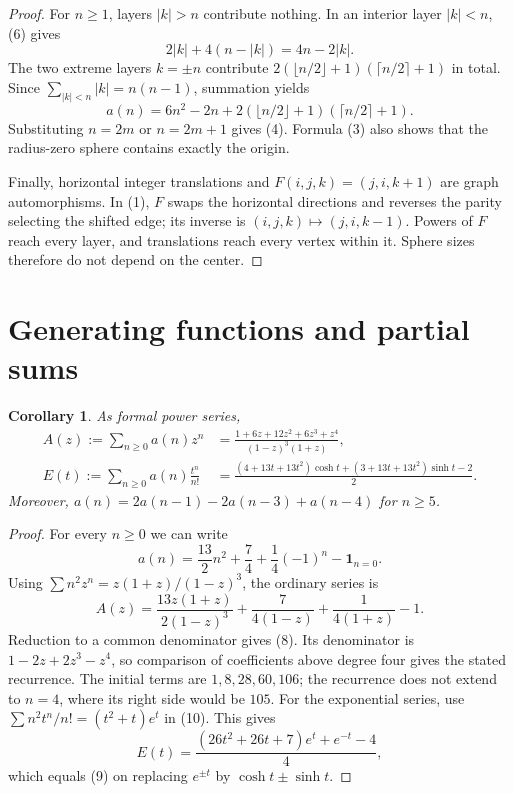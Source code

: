 \documentclass[10pt]{article}
\newtheorem{corollary}[theorem]{Corollary}
\begin{document}
\begin{proof}
For $n\geq1$, layers $|k|>n$ contribute nothing. In an interior
layer $|k|<n$, (6) gives
\[
 2|k|+4(n-|k|)=4n-2|k|.
\]
The two extreme layers $k=\pm n$ contribute
$2(\lfloor n/2\rfloor+1)(\lceil n/2\rceil+1)$ in total.
Since $\sum_{|k|<n}|k|=n(n-1)$, summation yields
\[
 a(n)=6n^2-2n+
       2(\lfloor n/2\rfloor+1)(\lceil n/2\rceil+1).             \tag{7}
\]
Substituting $n=2m$ or $n=2m+1$ gives (4). Formula (3) also shows
that the radius-zero sphere contains exactly the origin.

Finally, horizontal integer translations and
$F(i,j,k)=(j,i,k+1)$ are graph automorphisms. In (1), $F$ swaps
the horizontal directions and reverses the parity selecting the shifted
edge; its inverse is $(i,j,k)\mapsto(j,i,k-1)$.
Powers of $F$ reach every layer, and translations reach every vertex
within it. Sphere sizes therefore do not depend on the center.
\end{proof}

\section{Generating functions and partial sums}
\begin{corollary}\label{series}
As formal power series,
\begin{align}
 A(z):=\sum_{n\geq0}a(n)z^n
 &=\frac{1+6z+12z^2+6z^3+z^4}{(1-z)^3(1+z)},                 \tag{8}\\
 E(t):=\sum_{n\geq0}a(n)\frac{t^n}{n!}
 &=\frac{(4+13t+13t^2)\cosh t+(3+13t+13t^2)\sinh t-2}{2}.   \tag{9}
\end{align}
Moreover, $a(n)=2a(n-1)-2a(n-3)+a(n-4)$ for $n\geq5$.
\end{corollary}
\begin{proof}
For every $n\geq0$ we can write
\[
 a(n)=\frac{13}{2}n^2+\frac74+\frac14(-1)^n-\mathbf1_{n=0}.
                                                                  \tag{10}
\]
Using $\sum n^2z^n=z(1+z)/(1-z)^3$, the ordinary series is
\[
 A(z)=\frac{13z(1+z)}{2(1-z)^3}+\frac7{4(1-z)}+
       \frac1{4(1+z)}-1.
\]
Reduction to a common denominator gives (8).
Its denominator is $1-2z+2z^3-z^4$, so comparison of coefficients
above degree four gives the stated recurrence. The initial terms are
$1,8,28,60,106$; the recurrence does not extend to $n=4$, where its
right side would be $105$.
For the exponential series, use
$\sum n^2t^n/n!=(t^2+t)e^t$ in (10). This gives
\[
 E(t)=\frac{(26t^2+26t+7)e^t+e^{-t}-4}{4},
\]
which equals (9) on replacing $e^{\pm t}$ by $\cosh t\pm\sinh t$.
\end{proof}
\end{document}
